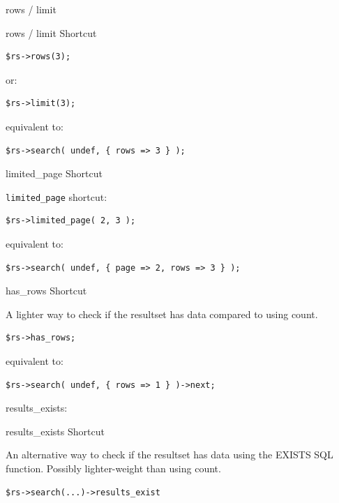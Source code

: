 rows / limit

\begin{frame}[fragile]{rows / limit Shortcut}

\begin{lstlisting}
$rs->rows(3);
\end{lstlisting}

or:

\begin{lstlisting}
$rs->limit(3);
\end{lstlisting}

equivalent to:

\begin{lstlisting}
$rs->search( undef, { rows => 3 } );
\end{lstlisting}

\end{frame}

\begin{frame}[fragile]{limited\_page Shortcut}

\verb|limited_page| shortcut:

\begin{lstlisting}
$rs->limited_page( 2, 3 );
\end{lstlisting}

equivalent to:

\begin{lstlisting}
$rs->search( undef, { page => 2, rows => 3 } );
\end{lstlisting}

\end{frame}

\begin{frame}[fragile]{has\_rows Shortcut}

A lighter way to check if the resultset has data compared to using count.

\begin{lstlisting}
$rs->has_rows;
\end{lstlisting}

equivalent to:

\begin{lstlisting}
$rs->search( undef, { rows => 1 } )->next;
\end{lstlisting}
\end{frame}

results\_exists:

\begin{frame}[fragile]{results\_exists Shortcut}

An alternative way to check if the resultset has data using the EXISTS SQL function. Possibly lighter-weight than using count.

\begin{lstlisting}
$rs->search(...)->results_exist
\end{lstlisting}
\end{frame}

